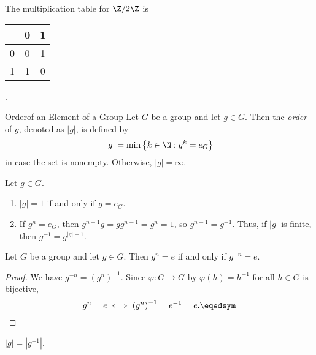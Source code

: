 \documentclass[pmath347]{subfiles}
\begin{document}
    The multiplication table for $\Z /2\Z$ is
    
    \begin{center}
        \begin{tabularx}{2cm}{c|cc}
            & 0 & 1 \\
            \hline
            0 & 0 & 1 \\
            1 & 1 & 0
        \end{tabularx}.
    \end{center}

    \begin{definition}{Order}{of an Element of a Group}
        Let $G$ be a group and let $g\in G$. Then the \emph{order} of $g$, denoted as $\left| g \right|$, is defined by
        \begin{equation*}
            \left| g \right| = \min\left\lbrace k\in\N: g^k=e_G \right\rbrace 
        \end{equation*}
        in case the set is nonempty. Otherwise, $\left| g \right| = \infty$.
    \end{definition}

    Let $g\in G$.
    \begin{enumerate}
        \item $\left| g \right| =1$ if and only if $g=e_G$.
        \item If $g^n=e_G$, then $g^{n-1}g = gg^{n-1} = g^n = 1$, so $g^{n-1} = g^{-1} $. Thus, if $\left| g \right|$ is finite, then $g^{-1} = g^{\left| g \right| -1}$.
    \end{enumerate}

    \begin{prop}{}
        Let $G$ be a group and let $g\in G$. Then $g^n = e$ if and only if $g^{-n} = e$. 
    \end{prop}

    \begin{proof}
        We have $g^{-n}=\left( g^n \right) ^{-1} $. Since $\varphi:G\to G$ by $\varphi\left( h \right) = h^{-1} $ for all $h\in G$ is bijective,
        \begin{equation*}
            g^n = e \iff \left( g^n \right) ^{-1} = e^{-1} = e. \eqedsym
        \end{equation*}
    \end{proof}

    \begin{cor}{}
        $\left| g \right| = \left| g^{-1} \right|$.
    \end{cor}	
\end{document}
